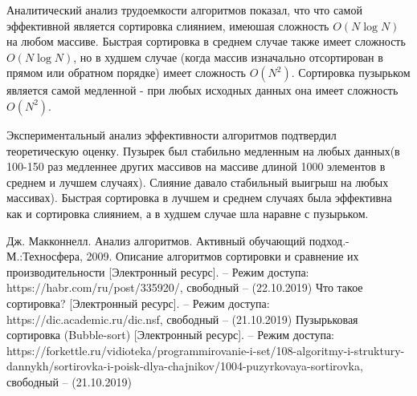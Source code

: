 \documentclass[a4paper,12pt]{article}
\begin{document}
	
	Аналитический анализ трудоемкости алгоритмов показал, что что самой эффективной является сортировка слиянием, имеюшая сложность $O(N\log N)$ на любом массиве. Быстрая сортировка в среднем случае также имеет сложность $O(N\log N)$, но в худшем случае (когда массив изначально отсортирован в прямом или обратном порядке) имеет сложность $O(N^2)$. Сортировка пузырьком является самой медленной - при любых исходных данных она имеет сложность $O(N^2)$.
	
	Экспериментальный анализ эффективности алгоритмов подтвердил теоретическую оценку. Пузырек был стабильно медленным на любых данных(в 100-150 раз медленнее других массивов на массиве длиной 1000 элементов в среднем и лучшем случаях). Слияние давало стабильный выигрыш на любых массивах). Быстрая сортировка в лучшем и среднем случаях была эффективна как и сортировка слиянием, а в худшем случае   шла наравне с пузырьком.
	


\pagebreak
{}
\begin{thebibliography}{4}
Дж. Макконнелл. Анализ алгоритмов. Активный обучающий подход.-
М.:Техносфера, 2009.
Описание алгоритмов сортировки и сравнение их производительности [Электронный ресурс]. – Режим доступа: https://habr.com/ru/post/335920/, свободный – (22.10.2019)
Что такое сортировка? [Электронный ресурс]. – Режим доступа: https://dic.academic.ru/dic.nsf, свободный – (21.10.2019)
Пузырьковая сортировка (Bubble-sort) [Электронный ресурс]. – Режим доступа: https://forkettle.ru/vidioteka/programmirovanie-i-set/108-algoritmy-i-struktury-dannykh/sortirovka-i-poisk-dlya-chajnikov/1004-puzyrkovaya-sortirovka, свободный – (21.10.2019)

\end{thebibliography}
\end{document}
